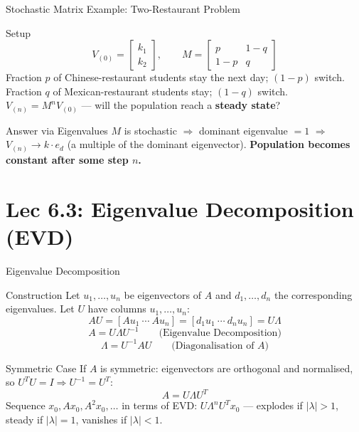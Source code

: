 \documentclass{beamer}
\begin{document}
\begin{frame}[shrink=10]{Stochastic Matrix Example: Two-Restaurant Problem}
  \begin{block}{Setup}
    \[
      V_{(0)} = \begin{bmatrix}k_1\\k_2\end{bmatrix},
      \qquad
      M = \begin{bmatrix}p & 1-q\\ 1-p & q\end{bmatrix}
    \]
    Fraction $p$ of Chinese-restaurant students stay the next day;
    $(1-p)$ switch.
    Fraction $q$ of Mexican-restaurant students stay;
    $(1-q)$ switch.\\[4pt]
    $V_{(n)} = M^n V_{(0)}$ ---
    will the population reach a \textbf{steady state}?
  \end{block}

  \medskip

  \begin{block}{Answer via Eigenvalues}
    $M$ is stochastic $\Rightarrow$ dominant eigenvalue $= 1$
    $\Rightarrow$ $V_{(n)} \to k\cdot e_d$ (a multiple of the dominant
    eigenvector).
    \textbf{Population becomes constant after some step $n$.}
  \end{block}
\end{frame}

\section{Lec 6.3: Eigenvalue Decomposition (EVD)}

\begin{frame}[shrink=10]{Eigenvalue Decomposition}
  \begin{block}{Construction}
    Let $u_1,\ldots,u_n$ be eigenvectors of $A$ and
    $d_1,\ldots,d_n$ the corresponding eigenvalues.
    Let $U$ have columns $u_1,\ldots,u_n$:
    \[
      AU = [Au_1\ \cdots\ Au_n]
         = [d_1u_1\ \cdots\ d_nu_n]
         = U\Lambda
    \]
    \[
      \boxed{A = U\Lambda U^{-1}}
      \qquad\text{(Eigenvalue Decomposition)}
    \]
    \[
      \Lambda = U^{-1}AU
      \qquad\text{(Diagonalisation of }A\text{)}
    \]
  \end{block}

  \medskip

  \begin{block}{Symmetric Case}
    If $A$ is symmetric: eigenvectors are orthogonal and normalised,
    so $U^TU = I \Rightarrow U^{-1} = U^T$:
    \[
      A = U\Lambda U^T
    \]
    Sequence $x_0,Ax_0,A^2x_0,\ldots$ in terms of EVD:
    $U\Lambda^n U^T x_0$ ---
    explodes if $|\lambda|>1$, steady if $|\lambda|=1$,
    vanishes if $|\lambda|<1$.
  \end{block}
\end{frame}
\end{document}
